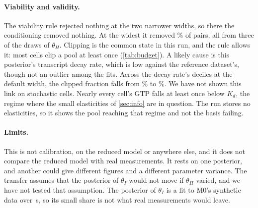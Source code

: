 \paragraph{Viability and validity.} The viability rule rejected nothing at the two
narrower widths, so there the conditioning removed nothing. At the widest it removed
\% of pairs, all from three of the  draws of
$\theta_H$. Clipping is the common state in this run, and the rule allows it: most cells
clip a pool at least once (\cref{tab:budget}). A likely cause is this posterior's transcript decay rate, which is low against the reference dataset's, though not an outlier among the  fits. Across the decay rate's deciles at the default width, the clipped
fraction falls from \% to \%. We have not shown
this link on stochastic cells. Nearly every cell's GTP falls at least once below $K_d$, the regime where the small elasticities of \cref{sec:info} are in question. The run stores no elasticities, so it shows the pool
reaching that regime and not the basis failing.

\paragraph{Limits.} This is not calibration, on the reduced model or anywhere else, and it does
not compare the reduced model with real measurements. It rests on one posterior, and another
could give different figures and a different parameter variance. The transfer assumes that the
posterior of $\theta_I$ would not move if $\theta_H$ varied, and we have not tested that
assumption. The posterior of $\theta_I$ is a fit to M0's synthetic data over
\,s, so its small share is not what real measurements would leave.

